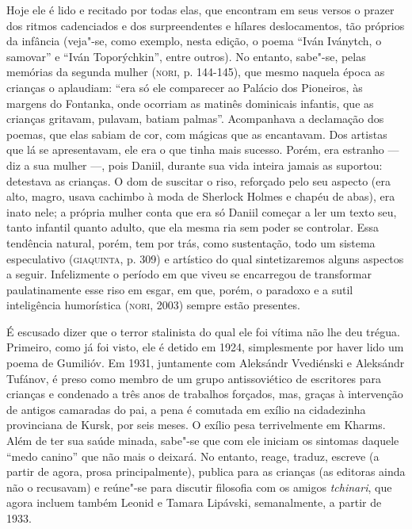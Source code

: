 Hoje ele é lido e recitado por todas elas, que encontram em seus versos
o prazer dos ritmos cadenciados e dos surpreendentes e hílares
deslocamentos, tão próprios da infância (veja"-se, como exemplo, nesta
edição, o poema ``Iván Iványtch, o samovar'' e ``Iván Toporýchkin'',
entre outros). No entanto, sabe"-se, pelas memórias da segunda mulher
(\textsc{nori}, p. 144-145), que mesmo naquela época as crianças o
aplaudiam: ``era só ele comparecer ao Palácio dos Pioneiros, às margens
do Fontanka, onde ocorriam as matinês dominicais infantis, que as
crianças gritavam, pulavam, batiam palmas''. Acompanhava a declamação
dos poemas, que elas sabiam de cor, com mágicas que as encantavam. Dos
artistas que lá se apresentavam, ele era o que tinha mais sucesso.
Porém, era estranho --- diz a sua mulher ---, pois Daniil, durante sua
vida inteira jamais as suportou: detestava as crianças. O dom de
suscitar o riso, reforçado pelo seu aspecto (era alto, magro, usava
cachimbo à moda de Sherlock Holmes e chapéu de abas), era inato nele; a
própria mulher conta que era só Daniil começar a ler um texto seu, tanto
infantil quanto adulto, que ela mesma ria sem poder se controlar. Essa
tendência natural, porém, tem por trás, como sustentação, todo um
sistema especulativo (\textsc{giaquinta}, p. 309) e artístico do qual
sintetizaremos alguns aspectos a seguir. Infelizmente o período em que
viveu se encarregou de transformar paulatinamente esse riso em esgar, em
que, porém, o paradoxo e a sutil inteligência humorística
(\textsc{nori}, 2003) sempre estão presentes.

É escusado dizer que o terror stalinista do qual ele foi vítima não lhe
deu trégua. Primeiro, como já foi visto, ele é detido em 1924,
simplesmente por haver lido um poema de Gumilióv. Em 1931, juntamente
com Aleksándr Vvediénski e Aleksándr Tufánov, é preso como membro de um
grupo antissoviético de escritores para crianças e condenado a três anos
de trabalhos forçados, mas, graças à intervenção de antigos camaradas do
pai, a pena é comutada em exílio na cidadezinha provinciana de Kursk,
por seis meses. O exílio pesa terrivelmente em Kharms. Além de ter sua
saúde minada, sabe"-se que com ele iniciam os sintomas daquele ``medo
canino'' que não mais o deixará. No entanto, reage, traduz, escreve (a
partir de agora, prosa principalmente), publica para as crianças (as
editoras ainda não o recusavam) e reúne"-se para discutir filosofia com
os amigos \emph{tchinari}, que agora incluem também Leonid e Tamara
Lipávski, semanalmente, a partir de 1933.

